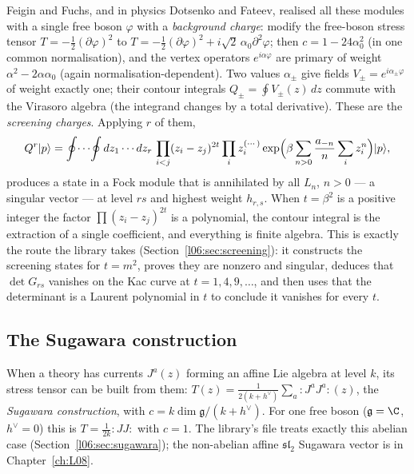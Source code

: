 Feigin and Fuchs, and in physics Dotsenko and Fateev, realised all these modules with a single free
boson $\varphi$ with a \emph{background charge}: modify the free-boson stress tensor
$T = -\frac12(\partial\varphi)^2$ to $T = -\frac12(\partial\varphi)^2 + i\sqrt2\,\alpha_0\partial^2\varphi$; then
$c = 1-24\alpha_0^2$ (in one common normalisation), and the vertex operators $e^{i\alpha\varphi}$ are
primary of weight $\alpha^2-2\alpha\alpha_0$ (again normalisation-dependent). Two values $\alpha_\pm$ give
fields $V_\pm = e^{i\alpha_\pm\varphi}$ of weight exactly one; their contour integrals
$Q_\pm = \oint V_\pm(z)\,dz$ commute with the Virasoro algebra (the integrand changes by a total
derivative). These are the \emph{screening charges}. Applying $r$ of them,
\begin{equation*}
 Q^r|p\rangle = \oint\!\cdots\!\oint dz_1\cdots dz_r\,\prod_{i<j}(z_i-z_j)^{2t}\prod_i z_i^{(\cdots)}
 \exp\Bigl(\beta\sum_{n>0}\frac{a_{-n}}{n}\sum_i z_i^n\Bigr)|p\rangle ,
\end{equation*}
produces a state in a Fock module that is annihilated by all $L_n$, $n>0$ --- a singular vector ---
at level $rs$ and highest weight $h_{r,s}$. When $t = \beta^2$ is a positive integer the factor
$\prod(z_i-z_j)^{2t}$ is a polynomial, the contour integral is the extraction of a single coefficient,
and everything is finite algebra. This is exactly the route the library takes
(Section~\ref{l06:sec:screening}): it constructs the screening states for $t = m^2$, proves they are
nonzero and singular, deduces that $\det G_{rs}$ vanishes on the Kac curve at $t = 1,4,9,\dots$, and then
uses that the determinant is a Laurent polynomial in $t$ to conclude it vanishes for every $t$.

\subsection{The Sugawara construction}

When a theory has currents $J^a(z)$ forming an affine Lie algebra at level $k$, its stress tensor can be
built from them: $T(z) = \frac{1}{2(k+h^\vee)}\sum_a{:}J^aJ^a{:}(z)$, the \emph{Sugawara construction},
with $c = k\dim\mathfrak g/(k+h^\vee)$. For one free boson ($\mathfrak g = \C$, $h^\vee = 0$) this is
$T = \frac{1}{2k}{:}JJ{:}$ with $c = 1$. The library's file  treats
exactly this abelian case (Section~\ref{l06:sec:sugawara}); the non-abelian affine $\mathfrak{sl}_2$
Sugawara vector is in Chapter~\ref{ch:L08}.


